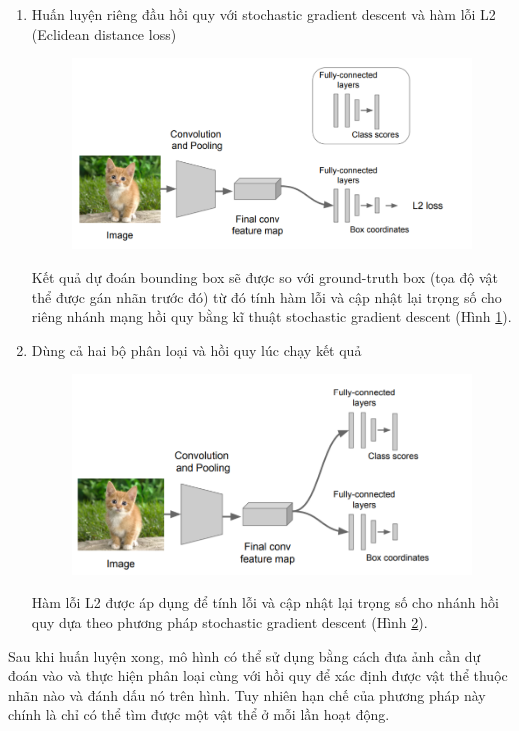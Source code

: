 \begin{enumerate}
	\item Huấn luyện riêng đầu hồi quy với stochastic gradient descent và hàm lỗi L2 (Eclidean distance loss)
	\begin{center}
    \begin{figure}[H]
    \centering
    \includegraphics[width=0.8\columnwidth]{images/chap2/localization_4.png}
    \label{fig:2.25}
    \end{figure}
	\end{center}
	Kết quả dự đoán bounding box sẽ được so với ground-truth box (tọa độ vật thể được gán nhãn trước đó) từ đó tính hàm lỗi và cập nhật lại trọng số cho riêng nhánh mạng hồi quy bằng kĩ thuật stochastic gradient descent (Hình \ref{fig:2.25}).
	\item Dùng cả hai bộ phân loại và hồi quy lúc chạy kết quả
	\begin{center}
    \begin{figure}[H]
    \centering
    \includegraphics[width=0.8\columnwidth]{images/chap2/localization_5.png}
    \label{fig:2.26}
    \end{figure}
	\end{center}
	Hàm lỗi L2 được áp dụng để tính lỗi và cập nhật lại trọng số cho nhánh hồi quy dựa theo phương pháp stochastic gradient descent (Hình \ref{fig:2.26}).
\end{enumerate}
Sau khi huấn luyện xong, mô hình có thể sử dụng bằng cách đưa ảnh cần dự đoán vào và thực hiện phân loại cùng với hồi quy để xác định được vật thể thuộc nhãn nào và đánh dấu nó trên hình.
Tuy nhiên hạn chế của phương pháp này chính là chỉ có thể tìm được một vật thể ở mỗi lần hoạt động.
